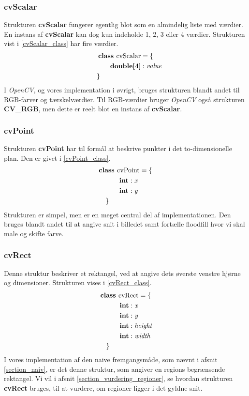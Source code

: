 {\subsubsection{cvScalar}
Strukturen \textbf{cvScalar} fungerer egentlig blot som en almindelig
liste med værdier. En instans af \textbf{cvScalar} kan dog kun indeholde
1, 2, 3 eller 4 værdier. Strukturen vist i \eqref{cvScalar_class} har fire
værdier.
\begin{multline}
    \textbf{class~} \textrm{cvScalar} = \{ \\
    \shoveleft{\qquad\textbf{double[4]} : \textit{value}} \\
    \shoveleft{\}}\shoveright{}
    \label{cvScalar_class}
\end{multline}
I \emph{OpenCV}, og vores implementation i øvrigt, bruges strukturen
blandt andet til RGB-farver og tærskelværdier. Til RGB-værdier bruger
\emph{OpenCV} også strukturen \textbf{CV\_RGB}, men dette er reelt blot
en instans af \textbf{cvScalar}.

\subsubsection{cvPoint}
Strukturen \textbf{cvPoint} har til formål at beskrive punkter i det
to-dimensionelle plan. Den er givet i \eqref{cvPoint_class}.
\begin{multline}
    \textbf{class~} \textrm{cvPoint} = \{ \\
    \shoveleft{\qquad\textbf{int} : \textit{x}} \\
    \shoveleft{\qquad\textbf{int} : \textit{y}} \\
    \shoveleft{\}}\shoveright{}
    \label{cvPoint_class}
\end{multline}
Strukturen er simpel, men er en meget central del af implementationen.
Den bruges blandt andet til at angive snit i billedet samt fortælle
floodfill hvor vi skal male og skifte farve.

\subsubsection{cvRect}
Denne struktur beskriver et rektangel, ved at angive dets øverste venstre
hjørne og dimensioner. Strukturen vises i \eqref{cvRect_class}.
\begin{multline}
    \textbf{class~} \textrm{cvRect} = \{ \\
    \shoveleft{\qquad\textbf{int} : \textit{x}} \\
    \shoveleft{\qquad\textbf{int} : \textit{y}} \\
    \shoveleft{\qquad\textbf{int} : \textit{height}} \\
    \shoveleft{\qquad\textbf{int} : \textit{width}} \\
    \shoveleft{\}}\shoveright{}
    \label{cvRect_class}
\end{multline}
I vores implementation af den naive fremgangsmåde, som nævnt i afsnit
\ref{section_naiv}, er det denne struktur, som angiver en regions
begrænsende rektangel. Vi vil i afsnit \ref{section_vurdering_regioner},
se hvordan strukturen \textbf{cvRect} bruges, til at vurdere, om regioner
ligger i det gyldne snit.

}
